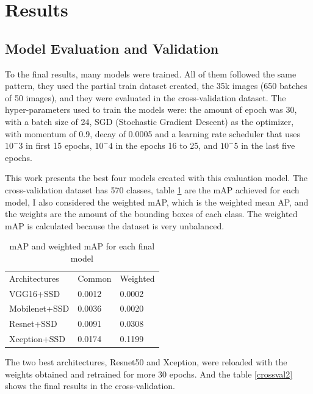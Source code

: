 \documentclass[11pt, a4paper, twocolumn]{article}
\begin{document}
\section{Results}

\subsection{Model Evaluation and Validation}


To the final results, many models were trained. All of them followed the same pattern, they used the partial train dataset created, the 35k images (650 batches of 50 images), and they were evaluated in the cross-validation dataset. The hyper-parameters used to train the models were: the amount of epoch was 30, with a batch size of 24, SGD (Stochastic Gradient Descent) as the optimizer, with momentum of 0.9, decay of 0.0005 and a learning rate scheduler that uses $10^-3$ in first 15 epochs, $10^-4$ in the epochs 16 to 25, and $10^-5$ in the last five epochs.

This work presents the best four models created with this evaluation model. The cross-validation dataset has 570 classes, table \ref{crossval1} are the mAP achieved for each model, I also considered the weighted mAP, which is the weighted mean AP, and the weights are the amount of the bounding boxes of each class. The weighted mAP is calculated because the dataset is very unbalanced.

\begin{table}[!ht]
	\begin{tabular}{lll}
		\rowcolor[HTML]{EFEFEF} 
		Architectures & Common & Weighted \\
		VGG16+SSD     & 0.0012 & 0.0002   \\
		\rowcolor[HTML]{EFEFEF} 
		Mobilenet+SSD & 0.0036 & 0.0020   \\
		\rowcolor[HTML]{FFFFFF} 
		Resnet+SSD    & 0.0091 & 0.0308   \\
		\rowcolor[HTML]{EFEFEF} 
		Xception+SSD  & 0.0174 & 0.1199  
	\end{tabular}
	\caption{mAP and weighted mAP for each final model}
	\label{crossval1}
\end{table}

The two best architectures, Resnet50 and Xception, were reloaded with the weights obtained and retrained for more 30 epochs. And the table \ref{crossval2} shows the final results in the cross-validation.
\end{document}

